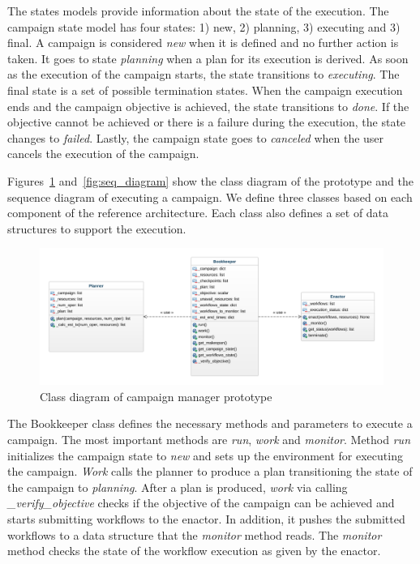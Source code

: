 The states models provide information about the state of the execution.
The campaign state model has four states: 1) new, 2) planning, 3) executing and 3) final.
A campaign is considered \textit{new} when it is defined and no further action is taken.
It goes to state \textit{planning} when a plan for its execution is derived.
As soon as the execution of the campaign starts, the state transitions to \textit{executing}.
The final state is a set of possible termination states.
When the campaign execution ends and the campaign objective is achieved, the state transitions to \textit{done}.
If the objective cannot be achieved or there is a failure during the execution, the state changes to \textit{failed}.
Lastly, the campaign state goes to \textit{canceled} when the user cancels the execution of the campaign.


Figures~\ref{fig:rcm_class_diagram} and~\ref{fig:seq_diagram} show the class diagram of the prototype and the sequence diagram of executing a campaign.
We define three classes based on each component of the reference architecture.
Each class also defines a set of data structures to support the execution.

\begin{figure}[t]
    \centering
    \includegraphics[width=.95\textwidth]{figures/manager/class_diagram.png}
    \caption{Class diagram of campaign manager prototype}\label{fig:rcm_class_diagram}
\end{figure}

The Bookkeeper class defines the necessary methods and parameters to execute a campaign.
The most important methods are \textit{run}, \textit{work} and \textit{monitor}.
Method \textit{run} initializes the campaign state to \textit{new} and sets up the environment for executing the campaign.
\textit{Work} calls the planner to produce a plan transitioning the state of the campaign to \textit{planning}.
After a plan is produced, \textit{work} via calling \textit{\_verify\_objective} checks if the objective of the campaign can be achieved and starts submitting workflows to the enactor.
In addition, it pushes the submitted workflows to a data structure that the \textit{monitor} method reads.
The \textit{monitor} method checks the state of the workflow execution as given by the enactor.



